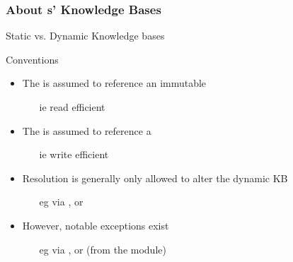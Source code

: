 \documentclass[handout]{beamer}
\begin{document}
\subsubsection{About s' Knowledge Bases}

\begin{frame}[allowframebreaks]{Static vs. Dynamic Knowledge bases}
    \begin{alertblock}{Conventions}
        \begin{itemize}
            \item The  is assumed to reference an \alert{immutable} 
            \begin{itemize}
                \item[ie] read efficient
            \end{itemize}

            \item The  is assumed to reference a 
            \begin{itemize}
                \item[ie] write efficient
            \end{itemize}

            \item Resolution is generally only allowed to alter the \alert{dynamic} KB
            \begin{itemize}
                \item[eg] via , or 
            \end{itemize}

            \item However, notable exceptions exist
            \begin{itemize}
                \item[eg] via , or  (from the  module)
            \end{itemize}
        \end{itemize}
    \end{alertblock}
\end{frame}
\end{document}
